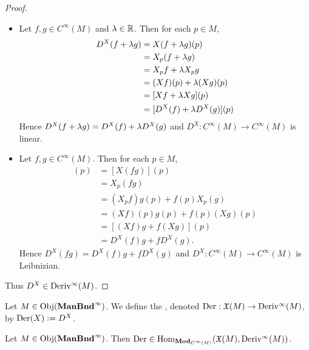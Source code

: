 \documentclass{book}
\begin{document}
\begin{proof}\
	\begin{itemize}
		\item Let $f, g \in C^{\infty}(M)$ and $\lambda \in \mathbb{R}$. Then for each $p \in M$,
		\begin{align*}
			D^X(f + \lambda g)
			& = X(f + \lambda g)(p) \\
			& = X_p(f+ \lambda g) \\
			& = X_pf + \lambda X_p g \\
			& = (Xf)(p) + \lambda (Xg)(p) \\
			& = [Xf + \lambda Xg](p) \\
			& = [D^X(f) + \lambda D^X(g)](p)
		\end{align*}
		Hence $D^X(f + \lambda g) = D^X(f) + \lambda D^X(g)$ and $D^X: C^{\infty}(M) \rightarrow C^{\infty}(M)$ is linear.
		\item Let $f,g \in C^{\infty}(M)$. Then for each $p \in M$,
		\begin{align*}
			[D^X(fg)](p)
			& = [X(fg)](p) \\
			& = X_p(fg) \\
			& = (X_pf)g(p) + f(p)X_p(g) \\
			& = (Xf)(p)g(p) + f(p)(Xg)(p) \\
			& = [(Xf)g + f(Xg)](p) \\
			& = D^X(f)g + fD^X(g).
		\end{align*}
		Hence $D^X(fg) = D^X(f)g + fD^X(g)$ and $D^X: C^{\infty}(M) \rightarrow C^{\infty}(M)$ is Leibnizian. 
	\end{itemize}
	Thus $D^X \in \operatorname{Deriv^{\infty}}(M)$.
\end{proof}

\begin{defn}
	Let $M \in \operatorname{Obj}(\operatorname*{\text{\textbf{ManBnd}}^{\infty}})$. We define the , denoted $\text{Der}:\mathfrak{X}(M) \rightarrow \operatorname{Deriv^{\infty}}(M)$, by $\text{Der}(X) \vcentcolon= D^X$.
\end{defn}

\begin{ex}
	Let $M \in \operatorname{Obj}(\operatorname*{\text{\textbf{ManBnd}}^{\infty}})$. Then $\text{Der} \in \operatorname{Hom}_{\operatorname*{\text{\textbf{Mod}}}_{C^{\infty}(M)}}(\mathfrak{X}(M), \operatorname{Deriv^{\infty}}(M))$.
\end{ex}
\end{document}
